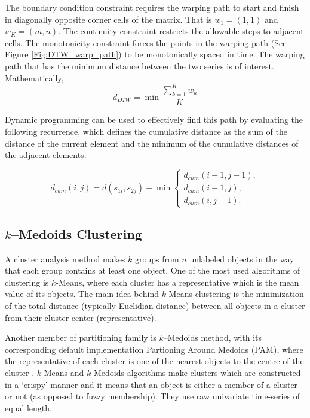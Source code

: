 The boundary condition constraint requires the warping path to start and finish in diagonally opposite corner cells of the matrix. That is $w_{1} = (1, 1)$ and $w_{K} = (m, n)$. The continuity constraint restricts the allowable steps to adjacent cells. The monotonicity constraint forces the points in the warping path (See Figure \ref{Fig:DTW_warp_path}) to be monotonically spaced in time. The warping path that has the minimum distance between the two series is of interest. Mathematically, 
\begin{equation}
d_{DTW} = \min \frac{\sum_{k=1}^{K} w_{k}}{K}
\end{equation}

Dynamic programming can be used to effectively find this path by evaluating the following recurrence, which defines the cumulative distance as the sum of the distance of the current element and the minimum of the cumulative distances of the adjacent elements:

\begin{equation}
d_{cum}(i,j) = d(s_{1i}, s_{2j}) + \min\left\{\begin{array}{l}
                                                d_{cum} (i-1, j-1),\\
                                                d_{cum} (i-1, j ),\\
                                                d_{cum} (i, j-1).
                                                \end{array}
                                                \right.
\end{equation}

\subsection{$k$--Medoids Clustering }
\label{Sec:kMedoidsClustering}

A cluster analysis method makes $k$ groups from $n$ unlabeled objects in the way that each group contains at least one object. One of the most used algorithms of clustering is $k$-Means, where each cluster has a representative which is the mean value of its objects. The main idea behind $k$-Means clustering is the minimization of the total distance (typically Euclidian distance) between all objects in a cluster from their cluster center (representative).

Another member of partitioning family is $k$--Medoids method, with its corresponding default implementation  Partioning Around Medoids (PAM), where the representative of each cluster is one of the nearest objects to the centre of the cluster \cite{Kaufman2009}. $k$-Means and $k$-Medoids algorithms make clusters which are constructed in a `crispy' manner and it means that an object is either a member of a cluster or not (as opposed to fuzzy membership). They use raw univariate time-series of equal length.

